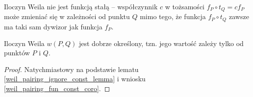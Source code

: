 \begin{remark}
Iloczyn Weila nie jest funkcją stałą --
współczynnik $c$ w tożsamości $f_P \circ t_Q = cf_P$
może zmieniać się w zależności od punktu $Q$ mimo tego,
że funkcja $f_P \circ t_Q$ zawsze ma taki sam dywizor jak funkcja $f_P$.
\end{remark}

\begin{theorem}
Iloczyn Weila $w(P, Q)$ jest dobrze określony,
tzn. jego wartość zależy tylko od punktów $P$ i $Q$.
\end{theorem}

\begin{proof}
Natychmiastowy na podstawie
lematu \ref{weil_pairing_ignore_const_lemma}
i wniosku \ref{weil_pairing_fun_const_coro}.
\end{proof}
